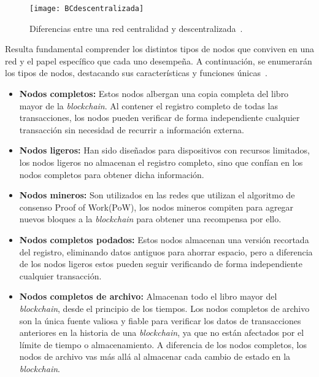 \begin{figure}[h]
	\label{img:BCdescentralizada}
	\centering
	\texttt{[image: BCdescentralizada]}
	\caption[Tipos de redes]{Diferencias entre una red centralidad y descentralizada~\cite{tiposRedes}.}
\end{figure}


Resulta fundamental comprender los distintos tipos de nodos que conviven en una red y el papel específico que cada uno desempeña. A continuación, se enumerarán los tipos de nodos, destacando sus características y funciones únicas~\cite{tiposNodos}.

\begin{itemize}
\item \textbf{Nodos completos:} Estos nodos albergan una copia completa del libro mayor de la \textit{blockchain}. Al contener el registro completo de todas las transacciones, los nodos pueden verificar de forma independiente cualquier transacción sin necesidad de recurrir a información externa.

\item \textbf{Nodos ligeros:} Han sido diseñados para dispositivos con recursos limitados, los nodos ligeros no almacenan el registro completo, sino que confían en los nodos completos para obtener dicha información.

\item \textbf{Nodos mineros:} Son utilizados en las redes que utilizan el algoritmo de consenso Proof of Work(PoW), los nodos mineros compiten para agregar nuevos bloques a la \textit{blockchain} para obtener una recompensa por ello.

\item \textbf{Nodos completos podados:} Estos nodos almacenan una versión recortada del registro, eliminando datos antiguos para ahorrar espacio, pero a diferencia de los nodos ligeros estos pueden seguir verificando de forma independiente cualquier transacción. 

\item \textbf{Nodos completos de archivo:} Almacenan todo el libro mayor del \textit{blockchain}, desde el principio de los tiempos. Los nodos completos de archivo son la única fuente valiosa y fiable para verificar los datos de transacciones anteriores en la historia de una \textit{blockchain}, ya que no están afectados por el límite de tiempo o almacenamiento.
A diferencia de los nodos completos, los nodos de archivo vas más allá al almacenar cada cambio de estado en la \textit{blockchain}.


\end{itemize}
